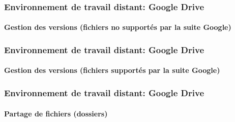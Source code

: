 \documentclass[xcolor=table]{beamer}
\begin{document}
\begin{frame}
\frametitle{Environnement de travail distant: Google Drive}
\framesubtitle{Gestion des versions (fichiers no supportés par la suite Google)}

\begin{center}
\end{center}

\end{frame}

\begin{frame}
\frametitle{Environnement de travail distant: Google Drive}
\framesubtitle{Gestion des versions (fichiers supportés par la suite Google)}

\begin{center}
	\vline
\end{center}

\end{frame}

\begin{frame}
\frametitle{Environnement de travail distant: Google Drive}
\framesubtitle{Partage de fichiers (dossiers)}

\begin{center}
\end{center}

\end{frame}

\end{document}

